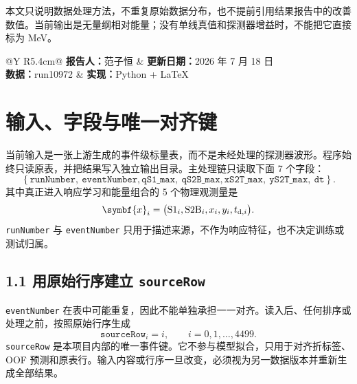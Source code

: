 \documentclass[UTF8,11pt,a4paper,oneside,fontset=none]{ctexart}
\newcommand{\SoneLY}{\mathrm{S1}}
\newcommand{\StwoLY}{\mathrm{S2B}}
\begin{document}
\vspace{0.4cm}
\begin{boundarybox}[title={报告边界},fonttitle=\bfseries]
本文只说明数据处理方法，不重复原始数据分布，也不提前引用结果报告中的改善数值。当前输出是无量纲相对能量；没有单线真值和探测器增益时，不能把它直接标为 MeV。
\end{boundarybox}

\vfill
\begin{tabularx}{\textwidth}{@{}Y R{5.4cm}@{}}
\textbf{报告人：}范子恒 & \textbf{更新日期：}2026 年 7 月 18 日\\
\textbf{数据：}run10972 & \textbf{实现：}Python + LaTeX
\end{tabularx}

\vspace{0.32cm}
\noindent{\color{PandaTeal}\rule{\textwidth}{1.3pt}}
\clearpage

\section{输入、字段与唯一对齐键}

当前输入是一张上游生成的事件级标量表，而不是未经处理的探测器波形。程序始终只读原表，并把结果写入独立输出目录。主处理链只读取下面 7 个字段：
\begin{equation}
  \left\{
  \texttt{runNumber},\ \texttt{eventNumber},
  \texttt{qS1\_max},\ \texttt{qS2B\_max},
  \texttt{xS2T\_max},\ \texttt{yS2T\_max},\ \texttt{dt}
  \right\}.
\end{equation}
其中真正进入响应学习和能量组合的 5 个物理观测量是
\begin{equation}
  \symbf{x}_{i}
  =\bigl(\SoneLY_{i},\StwoLY_{i},x_i,y_i,t_{{\rm d},i}\bigr).
\end{equation}
\texttt{runNumber} 与 \texttt{eventNumber} 只用于描述来源，不作为响应特征，也不决定训练或测试归属。

\subsection*{1.1 用原始行序建立 \texttt{sourceRow}}

\texttt{eventNumber} 在表中可能重复，因此不能单独承担一一对齐。读入后、任何排序或处理之前，按照原始行序生成
\begin{equation}
  \texttt{sourceRow}_i=i,
  \qquad i=0,1,\ldots,4499.
\end{equation}
\texttt{sourceRow} 是本项目内部的唯一事件键。它不参与模型拟合，只用于对齐折标签、OOF 预测和原表行。输入内容或行序一旦改变，必须视为另一数据版本并重新生成全部结果。
\end{document}
